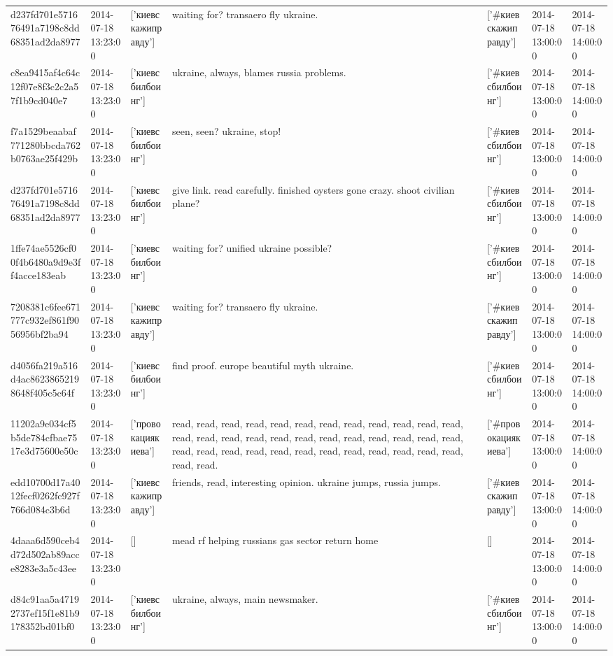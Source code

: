 \begin{tabular}{lllllll}
d237fd701e571676491a7198c8dd68351ad2da8977 & 2014-07-18 13:23:00 & ['киевскажиправду'] & waiting for? transaero fly ukraine. & ['#киевскажиправду'] & 2014-07-18 13:00:00 & 2014-07-18 14:00:00 \\
c8ea9415af4c64c12f07e8f3c2c2a57f1b9cd040e7 & 2014-07-18 13:23:00 & ['киевсбилбоинг'] & ukraine, always, blames russia problems. & ['#киевсбилбоинг'] & 2014-07-18 13:00:00 & 2014-07-18 14:00:00 \\
f7a1529beaabaf771280bbcda762b0763ae25f429b & 2014-07-18 13:23:00 & ['киевсбилбоинг'] & seen, seen? ukraine, stop! & ['#киевсбилбоинг'] & 2014-07-18 13:00:00 & 2014-07-18 14:00:00 \\
d237fd701e571676491a7198c8dd68351ad2da8977 & 2014-07-18 13:23:00 & ['киевсбилбоинг'] & give link. read carefully. finished oysters gone crazy. shoot civilian plane? & ['#киевсбилбоинг'] & 2014-07-18 13:00:00 & 2014-07-18 14:00:00 \\
1ffe74ae5526cf00f4b6480a9d9e3ff4acce183eab & 2014-07-18 13:23:00 & ['киевсбилбоинг'] & waiting for? unified ukraine possible? & ['#киевсбилбоинг'] & 2014-07-18 13:00:00 & 2014-07-18 14:00:00 \\
7208381c6fee671777c932ef861f9056956bf2ba94 & 2014-07-18 13:23:00 & ['киевскажиправду'] & waiting for? transaero fly ukraine. & ['#киевскажиправду'] & 2014-07-18 13:00:00 & 2014-07-18 14:00:00 \\
d4056fa219a516d4ac86238652198648f405c5c64f & 2014-07-18 13:23:00 & ['киевсбилбоинг'] & find proof. europe beautiful myth ukraine. & ['#киевсбилбоинг'] & 2014-07-18 13:00:00 & 2014-07-18 14:00:00 \\
11202a9e034cf5b5de784cfbae7517e3d75600e50c & 2014-07-18 13:23:00 & ['провокациякиева'] & read, read, read, read, read, read, read, read, read, read, read, read, read, read, read, read, read, read, read, read, read, read, read, read, read, read, read, read, read, read, read, read, read, read, read, read, read, read. & ['#провокациякиева'] & 2014-07-18 13:00:00 & 2014-07-18 14:00:00 \\
edd10700d17a4012fecf0262fc927f766d084c3b6d & 2014-07-18 13:23:00 & ['киевскажиправду'] & friends, read, interesting opinion. ukraine jumps, russia jumps. & ['#киевскажиправду'] & 2014-07-18 13:00:00 & 2014-07-18 14:00:00 \\
4daaa6d590ceb4d72d502ab89acce8283e3a5c43ee & 2014-07-18 13:23:00 & [] & mead rf helping russians gas sector return home & [] & 2014-07-18 13:00:00 & 2014-07-18 14:00:00 \\
d84c91aa5a47192737ef15f1e81b9178352bd01bf0 & 2014-07-18 13:23:00 & ['киевсбилбоинг'] & ukraine, always, main newsmaker. & ['#киевсбилбоинг'] & 2014-07-18 13:00:00 & 2014-07-18 14:00:00 \\

\end{tabular}
